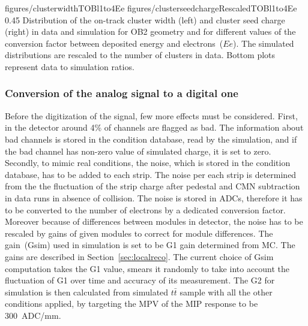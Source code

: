                  {figures/clusterwidthTOBl1to4Ee}
                 {figures/clusterseedchargeRescaledTOBl1to4Ee} %
                 {0.45}       %
                 { Distribution of the on-track cluster width (left) and cluster seed charge (right) in data and simulation for OB2 geometry and for different values of the conversion factor between deposited energy and electrons~($Ee$).  The simulated distributions are rescaled to the number of clusters in data.  Bottom plots represent data to simulation ratios. }


\subsubsection{Conversion of the analog signal to a digital one~\label{sec:digitize}}

Before the digitization of the signal, few more effects must be considered. First, in the detector around 4\% of channels are flagged as bad. The information about bad channels is stored in the condition database, read by the simulation, and if the bad channel has non-zero value of simulated charge, it is set to zero. Secondly, to mimic real conditions, the noise, which is stored in the condition database, has to be added to each strip. The noise per each strip is determined from the the fluctuation of the strip charge after pedestal and CMN subtraction in data runs in absence of collision. The noise is stored in ADCs, therefore it has to be converted to the number of electrons by a dedicated conversion factor. Moreover because of differences between modules in detector, the noise has to be rescaled by gains of given modules to correct for module differences. The gain~(Gsim) used in simulation is set to be G1 gain determined from MC. The gains are described in Section~\ref{sec:localreco}. The current choice of Gsim computation takes the G1 value, smears it randomly to take into account the fluctuation of G1 over time and accuracy of its measurement. The G2 for simulation is then calculated from simulated $t\bar{t}$ sample with all the other conditions applied, by targeting the MPV of the MIP response to be 300~ADC/mm.

